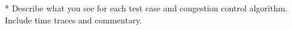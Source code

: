 

* Describe what you see for each test case and
congestion control algorithm. Include time traces
and commentary.


